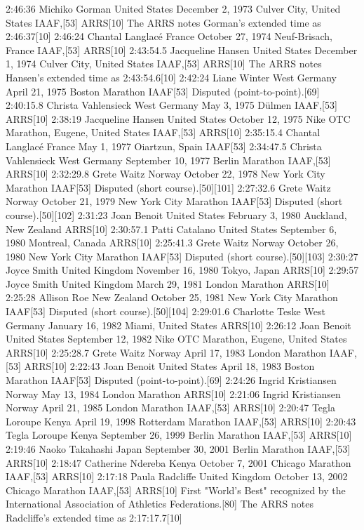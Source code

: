 2:46:36	Michiko Gorman	 United States	December 2, 1973	Culver City, United States	IAAF,[53] ARRS[10]	The ARRS notes Gorman's extended time as 2:46:37[10]
2:46:24	Chantal Langlacé	 France	October 27, 1974	Neuf-Brisach, France	IAAF,[53] ARRS[10]	
2:43:54.5	Jacqueline Hansen	 United States	December 1, 1974	Culver City, United States	IAAF,[53] ARRS[10]	The ARRS notes Hansen's extended time as 2:43:54.6[10]
2:42:24	Liane Winter	 West Germany	April 21, 1975	Boston Marathon	IAAF[53]	Disputed (point-to-point).[69]
2:40:15.8	Christa Vahlensieck	 West Germany	May 3, 1975	Dülmen	IAAF,[53] ARRS[10]	
2:38:19	Jacqueline Hansen	 United States	October 12, 1975	Nike OTC Marathon, Eugene, United States	IAAF,[53] ARRS[10]	
2:35:15.4	Chantal Langlacé	 France	May 1, 1977	Oiartzun, Spain	IAAF[53]	
2:34:47.5	Christa Vahlensieck	 West Germany	September 10, 1977	Berlin Marathon	IAAF,[53] ARRS[10]	
2:32:29.8	Grete Waitz	 Norway	October 22, 1978	New York City Marathon	IAAF[53]	Disputed (short course).[50][101]
2:27:32.6	Grete Waitz	 Norway	October 21, 1979	New York City Marathon	IAAF[53]	Disputed (short course).[50][102]
2:31:23	Joan Benoit	 United States	February 3, 1980	Auckland, New Zealand	ARRS[10]	
2:30:57.1	Patti Catalano	 United States	September 6, 1980	Montreal, Canada	ARRS[10]	
2:25:41.3	Grete Waitz	 Norway	October 26, 1980	New York City Marathon	IAAF[53]	Disputed (short course).[50][103]
2:30:27	Joyce Smith	 United Kingdom	November 16, 1980	Tokyo, Japan	ARRS[10]	
2:29:57	Joyce Smith	 United Kingdom	March 29, 1981	London Marathon	ARRS[10]	
2:25:28	Allison Roe	 New Zealand	October 25, 1981	New York City Marathon	IAAF[53]	Disputed (short course).[50][104]
2:29:01.6	Charlotte Teske	 West Germany	January 16, 1982	Miami, United States	ARRS[10]	
2:26:12	Joan Benoit	 United States	September 12, 1982	Nike OTC Marathon, Eugene, United States	ARRS[10]	
2:25:28.7	Grete Waitz	 Norway	April 17, 1983	London Marathon	IAAF,[53] ARRS[10]	
2:22:43	Joan Benoit	 United States	April 18, 1983	Boston Marathon	IAAF[53]	Disputed (point-to-point).[69]
2:24:26	Ingrid Kristiansen	 Norway	May 13, 1984	London Marathon	ARRS[10]	
2:21:06	Ingrid Kristiansen	 Norway	April 21, 1985	London Marathon	IAAF,[53] ARRS[10]	
2:20:47	Tegla Loroupe	 Kenya	April 19, 1998	Rotterdam Marathon	IAAF,[53] ARRS[10]	
2:20:43	Tegla Loroupe	 Kenya	September 26, 1999	Berlin Marathon	IAAF,[53] ARRS[10]	
2:19:46	Naoko Takahashi	 Japan	September 30, 2001	Berlin Marathon	IAAF,[53] ARRS[10]	
2:18:47	Catherine Ndereba	 Kenya	October 7, 2001	Chicago Marathon	IAAF,[53] ARRS[10]	
2:17:18	Paula Radcliffe	 United Kingdom	October 13, 2002	Chicago Marathon	IAAF,[53] ARRS[10]	First "World's Best" recognized by the International Association of Athletics Federations.[80] The ARRS notes Radcliffe's extended time as 2:17:17.7[10]
